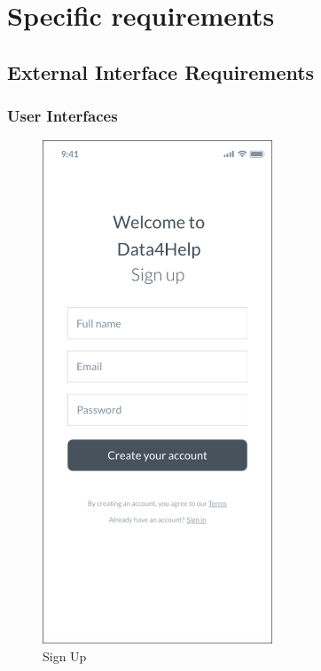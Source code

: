 \documentclass{article}
\begin{document}
\newpage
\section{Specific requirements}

\subsection{External Interface Requirements}

	\subsubsection{User Interfaces} 	
	
	\begin{figure}[!h]
	 	\centering
		\includegraphics[height=15cm,keepaspectratio]{Figures/1SignUp}
		\caption{Sign Up}
	\end{figure}\newpage
	
\end{document}
